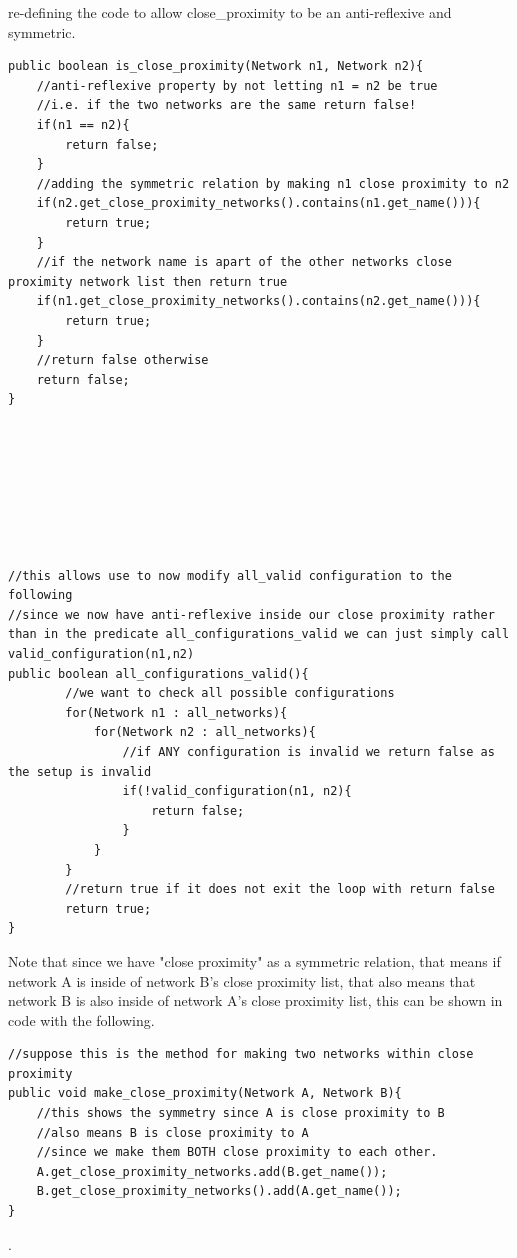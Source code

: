 \documentclass{article}
\begin{document}
\begin{enumerate}[(a)]
\begin{enumerate}[(i)]
            re-defining the code to allow close\_proximity to be an anti-reflexive and symmetric. 
            \begin{lstlisting}
public boolean is_close_proximity(Network n1, Network n2){
    //anti-reflexive property by not letting n1 = n2 be true
    //i.e. if the two networks are the same return false!
    if(n1 == n2){
        return false;
    }
    //adding the symmetric relation by making n1 close proximity to n2
    if(n2.get_close_proximity_networks().contains(n1.get_name())){
        return true;
    }
    //if the network name is apart of the other networks close proximity network list then return true
    if(n1.get_close_proximity_networks().contains(n2.get_name())){
        return true;
    }
    //return false otherwise
    return false;
}
            
            
            
            
            
            
            
            
//this allows use to now modify all_valid configuration to the following
//since we now have anti-reflexive inside our close proximity rather than in the predicate all_configurations_valid we can just simply call valid_configuration(n1,n2)
public boolean all_configurations_valid(){
        //we want to check all possible configurations
        for(Network n1 : all_networks){
            for(Network n2 : all_networks){
                //if ANY configuration is invalid we return false as the setup is invalid
                if(!valid_configuration(n1, n2){
                    return false;
                }
            }
        }
        //return true if it does not exit the loop with return false
        return true;
}
            \end{lstlisting}
             Note that since we have "close proximity" as a symmetric relation, that means if network A is inside of network B's close proximity list, that also means that network B is also inside of network A's close proximity list, this can be shown in code with the following.
        
        \begin{lstlisting}
//suppose this is the method for making two networks within close proximity
public void make_close_proximity(Network A, Network B){
    //this shows the symmetry since A is close proximity to B
    //also means B is close proximity to A
    //since we make them BOTH close proximity to each other.
    A.get_close_proximity_networks.add(B.get_name());
    B.get_close_proximity_networks().add(A.get_name());
}
        \end{lstlisting}.
        \end{enumerate}
       

\end{enumerate}
\end{document}
